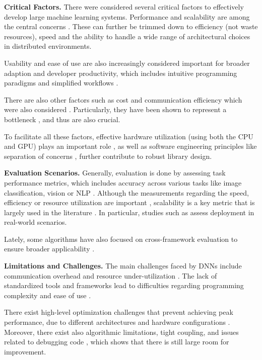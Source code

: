 \textbf{Critical Factors.}
There were considered several critical factors to effectively develop large machine learning systems.
Performance and scalability are among the central concerns . These
can further be trimmed down to efficiency (not waste resources), speed and the ability to handle
a wide range of architectural choices in distributed environments.

Usability and ease of use are also increasingly considered important for broader adaption and
developer productivity, which includes intuitive programming paradigms and simplified workflows
.

There are also other factors such as cost and communication efficiency which were also considered
. Particularly, they have been shown to represent a bottleneck ,
and thus are also crucial.

To facilitate all these factors, effective hardware utilization (using both the CPU and GPU) plays
an important role , as well as software engineering principles like separation of
concerns , further contribute to robust library design.

\textbf{Evaluation Scenarios.}
Generally, evaluation is done by assessing task performance metrics, which includes accuracy
across various tasks like image classification, vision or NLP .
Although the measurements regarding the speed, efficiency or resource utilization are important
, scalability is a key metric that is largely used in the literature
. In particular, studies such as  assess deployment
in real-world scenarios.

Lately, some algorithms have also focused on cross-framework evaluation to ensure broader
applicability .

\textbf{Limitations and Challenges.}
The main challenges faced by DNNs include communication overhead and resource under-utilization
. The lack of standardized tools and frameworks lead
to difficulties regarding programming complexity and ease of use .

There exist high-level optimization challenges that prevent achieving peak performance, due to
different architectures and hardware configurations . Moreover, there exist
also algorithmic limitations, tight coupling, and issues related to debugging code
, which shows that there is still large room for improvement.

